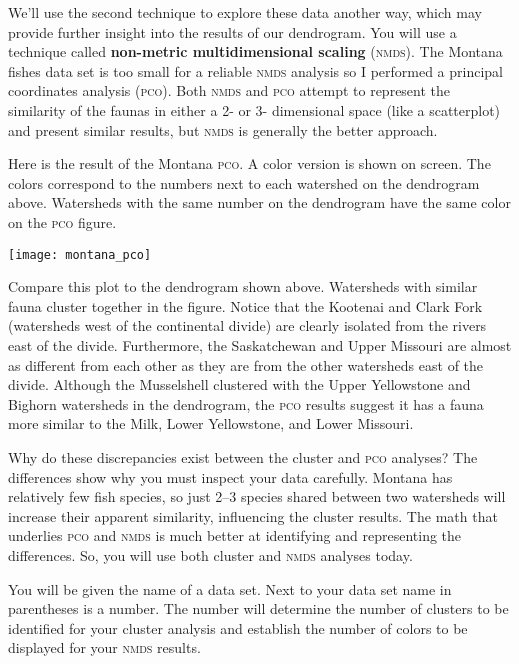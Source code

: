 \documentclass[11pt]{article}
\begin{document}
We'll use the second technique to explore these data another way, which may provide 
further insight into the results of our dendrogram.  You will use a technique called 
\textbf{non-metric multidimensional scaling} (\textsc{nmds}). The Montana fishes data set
is too small for a reliable \textsc{nmds} analysis so I performed a principal
coordinates analysis (\textsc{pco}). Both \textsc{nmds} 
and \textsc{pco} attempt to represent the similarity of the faunas in either a 2- or 3-
dimensional space (like a scatterplot) and present similar results, but \textsc{nmds} is generally the better approach.

Here is the result of the Montana \textsc{pco}. A 
color version is shown on screen. The colors correspond to the numbers next to each
watershed on the dendrogram above. Watersheds with the same number on the dendrogram
have the same color on the \textsc{pco} figure.

\begin{center}
	\texttt{[image: montana\_pco]}
\end{center}

Compare this plot to the dendrogram shown above. Watersheds with similar fauna cluster
together in the figure. Notice that the Kootenai and Clark Fork (watersheds west of the 
continental divide) are clearly isolated from the rivers east of the divide. Furthermore, 
the Saskatchewan and Upper Missouri are almost as different from each other as they are 
from the other watersheds east of the divide. Although the Musselshell clustered with the 
Upper Yellowstone and Bighorn watersheds in the dendrogram, the \textsc{pco} results 
suggest it has a fauna more similar to the Milk, Lower Yellowstone, and Lower Missouri.

Why do these discrepancies exist between the cluster and \textsc{pco} analyses? The
differences show why you must inspect your data carefully. Montana has relatively few fish
species, so just 2--3 species shared between two watersheds will increase their apparent similarity, 
influencing the cluster results. The math that underlies \textsc{pco} and \textsc{nmds}
is much better at identifying and representing the differences. So, you will use both cluster and \textsc{nmds} analyses
today.


You will be given the name of a data set. Next to your data set name in parentheses is a number.
The number will determine  the number of clusters to be identified for your cluster analysis and establish the number
of colors to be displayed for your \textsc{nmds} results.
\end{document}
